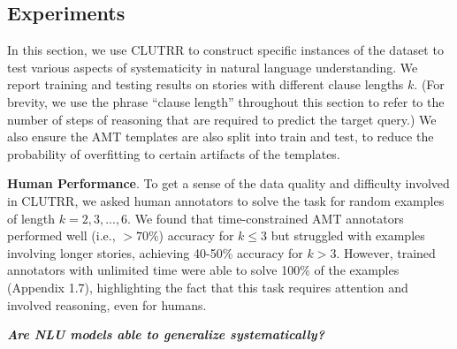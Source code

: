 \documentclass[12pt]{article}
\newcommand{\xhdr}[1]{{\noindent\bfseries #1}.}
\newcommand{\xit}[1]{{\noindent\textbf{\textit{#1}}}}
\begin{document}




\subsection{Experiments}

In this section, we use CLUTRR to construct specific instances of the dataset to test various aspects of systematicity in natural language understanding.
We report training and testing results on stories with different clause lengths $k$.
(For brevity, we use the phrase ``clause length'' throughout this section to refer to the number of steps of reasoning that are required to predict the target query.)
We also ensure the AMT templates are also split into train and test, to reduce the probability of overfitting to certain artifacts of the templates.

\xhdr{Human Performance} To get a sense of the data quality and difficulty involved in CLUTRR, we asked human annotators to solve the task for random examples of length $k=2,3,...,6$.
We found that time-constrained AMT annotators performed well (i.e., ${>70\%}$) accuracy for ${k\leq 3}$ but struggled with examples involving longer stories, achieving 40-50\% accuracy for ${k > 3}$. However, trained annotators with unlimited time were able to solve 100\% of the examples (Appendix 1.7), highlighting the fact that this task requires attention and involved reasoning, even for humans.

\xit{Are NLU models able to generalize systematically?}
\end{document}
